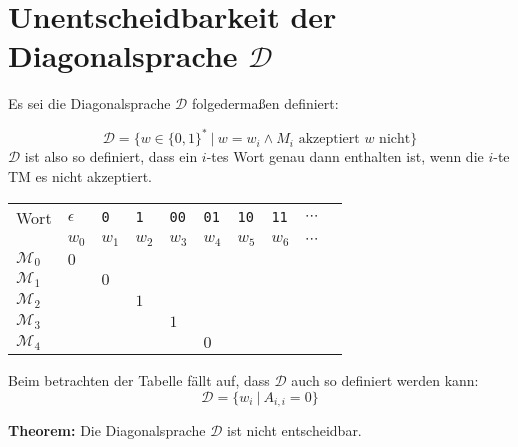 \documentclass{scrartcl}%
\begin{document}

    \section*{Unentscheidbarkeit der Diagonalsprache $\mathcal{D}$}
    \label{sec:unentscheidbarkeitDerDiagonalsprache}
    Es sei die Diagonalsprache $\mathcal{D}$ folgedermaßen definiert:

    \begin{equation*}
        \mathcal{D} = \{ w \in \{0,1\}^* \ | \ w =w_i \land M_i \text{ akzeptiert } w \text{ nicht} \}
    \end{equation*}
    $\mathcal{D}$ ist also so definiert,
    dass ein $i$-tes Wort genau dann enthalten ist, wenn die $i$-te TM es nicht akzeptiert.

    \begin{table}[H]
        \centering
        \small
        \begin{tabular}{C{1.5em}|C{1.5em}C{1.5em}C{1.5em}C{1.5em}C{1.5em}C{1.5em}C{1.5em}C{1.5em}C{1.5em}}
            \tiny Wort & \tiny $\epsilon$ & \tiny\texttt{0} & \tiny\texttt{1} & \tiny\texttt{00} & \tiny\texttt{01} & \tiny\texttt{10} & \tiny\texttt{11} & \tiny$\cdots$ \\
            & $w_0$  & $w_1$ & $w_2$ & $w_3$ & $w_4$ & $w_5$ & $w_6$ & \tiny$\cdots$ \\ \hline
            $\mathcal{M}_0$  & $0$  & & & & & & & \\
            $\mathcal{M}_1$  & & $0$ & & & & & & \\
            $\mathcal{M}_2$  & & & $1$ & & & & & \\
            $\mathcal{M}_3$  & & & & $1$ & & & & \\
            $\mathcal{M}_4$  & & & & & $0$ & & & \\
        \end{tabular}
    \end{table}

    Beim betrachten der Tabelle fällt auf, dass $\mathcal{D}$ auch so definiert werden kann:
    \begin{equation*}
        \mathcal{D} = \{ w_i \ | \ A_{i,i} = 0 \}
    \end{equation*}

    \textbf{\textsf{Theorem:}} Die Diagonalsprache $\mathcal{D}$ ist nicht entscheidbar.
\end{document}
